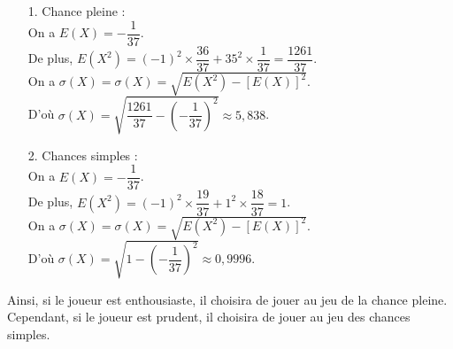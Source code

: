\begin{itemize}
\item[1.] Chance pleine : \\

On a $E\left(X\right) = -\dfrac{1}{37}$. \vspace*{.3cm} \\

De plus, $E\left(X^2\right) = \left(-1\right)^2 \times \dfrac{36}{37} + 35^2 \times \dfrac{1}{37} = \dfrac{1261}{37}$. \vspace*{.3cm} \\

On a $\sigma\left(X\right) = \sigma\left(X\right) = \sqrt{E\left(X^2\right) - \left[E\left(X\right)\right]^2}$. \vspace*{.3cm} \\

D'où $\sigma\left(X\right) = \sqrt{\dfrac{1261}{37} - \left(-\dfrac{1}{37}\right)^2} \approx 5,838$. \\

\item[2.] Chances simples : \\

On a $E\left(X\right) = -\dfrac{1}{37}$. \vspace*{.3cm} \\

De plus, $E\left(X^2\right) = \left(-1\right)^2 \times \dfrac{19}{37} + 1^2 \times \dfrac{18}{37} = 1$. \vspace*{.3cm} \\

On a $\sigma\left(X\right) = \sigma\left(X\right) = \sqrt{E\left(X^2\right) - \left[E\left(X\right)\right]^2}$. \vspace*{.3cm} \\

D'où $\sigma\left(X\right) = \sqrt{1 - \left(-\dfrac{1}{37}\right)^2} \approx 0,9996$. \\
\end{itemize}

\vspace*{.3cm}

Ainsi, si le joueur est enthousiaste, il choisira de jouer au jeu de la chance pleine. Cependant, si le joueur est prudent, il choisira de jouer au jeu des chances simples. 